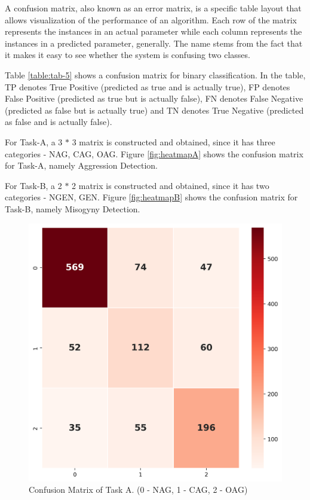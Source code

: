 \documentclass[conference]{IEEEtran}
\begin{document}
A confusion matrix, also known as an error matrix, is a specific table layout that allows visualization of the performance of an algorithm. Each row of the matrix represents the instances in an actual parameter while each column represents the instances in a predicted parameter, generally. The name stems from the fact that it makes it easy to see whether the system is confusing two classes.

Table \eqref{table:tab-5} shows a confusion matrix for binary classification. In the table, TP denotes True Positive (predicted as true and is actually true), FP denotes False Positive (predicted
as true but is actually false), FN denotes False Negative (predicted as false but is actually true) and TN denotes True Negative (predicted as false and is actually false).

For Task-A, a 3 $*$ 3 matrix is constructed and obtained, since it has three categories - NAG, CAG, OAG. Figure \eqref{fig:heatmapA} shows the confusion matrix for Task-A, namely Aggression Detection.

For Task-B, a 2 $*$ 2 matrix is constructed and obtained, since it has two categories - NGEN, GEN. Figure \eqref{fig:heatmapB} shows the confusion matrix for Task-B, namely Misogyny Detection.

\begin{figure}[t!]
    \centering
    \includegraphics[scale=0.5]{assets/heatmap_task_A.png}
    \caption{Confusion Matrix of Task A. (0 - NAG, 1 - CAG, 2 - OAG)}
    \label{fig:heatmapA}
\end{figure}
\end{document}
